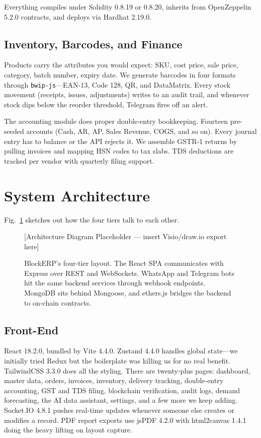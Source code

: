 \documentclass[conference]{IEEEtran}
\begin{document}
Everything compiles under Solidity 0.8.19 or 0.8.20, inherits from OpenZeppelin 5.2.0 contracts, and deploys via Hardhat 2.19.0.

\subsection{Inventory, Barcodes, and Finance}
Products carry the attributes you would expect: SKU, cost price, sale price, category, batch number, expiry date. We generate barcodes in four formats through \texttt{bwip-js}---EAN-13, Code 128, QR, and DataMatrix. Every stock movement (receipts, issues, adjustments) writes to an audit trail, and whenever stock dips below the reorder threshold, Telegram fires off an alert.

The accounting module does proper double-entry bookkeeping. Fourteen pre-seeded accounts (Cash, AR, AP, Sales Revenue, COGS, and so on). Every journal entry has to balance or the API rejects it. We assemble GSTR-1 returns by pulling invoices and mapping HSN codes to tax slabs. TDS deductions are tracked per vendor with quarterly filing support.

\section{System Architecture}

Fig.~\ref{fig_arch} sketches out how the four tiers talk to each other.

\begin{figure}[htbp]
\centerline{[Architecture Diagram Placeholder --- insert Visio/draw.io export here]}
\caption{BlockERP's four-tier layout. The React SPA communicates with Express over REST and WebSockets. WhatsApp and Telegram bots hit the same backend services through webhook endpoints. MongoDB sits behind Mongoose, and ethers.js bridges the backend to on-chain contracts.}
\label{fig_arch}
\end{figure}

\subsection{Front-End}
React 18.2.0, bundled by Vite 4.4.0. Zustand 4.4.0 handles global state---we initially tried Redux but the boilerplate was killing us for no real benefit. TailwindCSS 3.3.0 does all the styling. There are twenty-plus pages: dashboard, master data, orders, invoices, inventory, delivery tracking, double-entry accounting, GST and TDS filing, blockchain verification, audit logs, demand forecasting, the AI data assistant, settings, and a few more we keep adding. Socket.IO 4.8.1 pushes real-time updates whenever someone else creates or modifies a record. PDF report exports use jsPDF 4.2.0 with html2canvas 1.4.1 doing the heavy lifting on layout capture.
\end{document}
